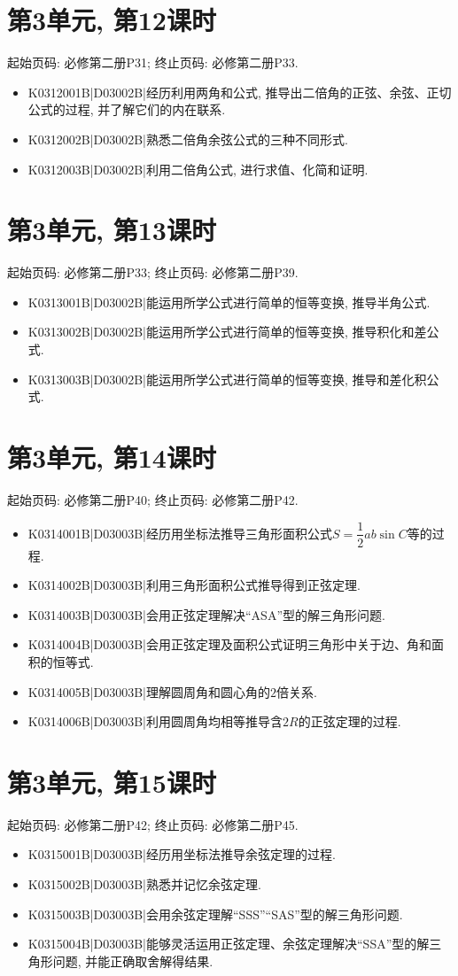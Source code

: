 \section*{第3单元, 第12课时}
起始页码: 必修第二册P31; 终止页码: 必修第二册P33.
\begin{itemize}
\item K0312001B|D03002B|经历利用两角和公式, 推导出二倍角的正弦、余弦、正切公式的过程, 并了解它们的内在联系.
\item K0312002B|D03002B|熟悉二倍角余弦公式的三种不同形式.
\item K0312003B|D03002B|利用二倍角公式, 进行求值、化简和证明.
\end{itemize}

\section*{第3单元, 第13课时}
起始页码: 必修第二册P33; 终止页码: 必修第二册P39.
\begin{itemize}
\item K0313001B|D03002B|能运用所学公式进行简单的恒等变换, 推导半角公式.
\item K0313002B|D03002B|能运用所学公式进行简单的恒等变换, 推导积化和差公式.
\item K0313003B|D03002B|能运用所学公式进行简单的恒等变换, 推导和差化积公式.
\end{itemize}

\section*{第3单元, 第14课时}
起始页码: 必修第二册P40; 终止页码: 必修第二册P42.
\begin{itemize}
\item K0314001B|D03003B|经历用坐标法推导三角形面积公式$S=\dfrac{1}{2}ab\sin C$等的过程.
\item K0314002B|D03003B|利用三角形面积公式推导得到正弦定理.
\item K0314003B|D03003B|会用正弦定理解决``ASA''型的解三角形问题.
\item K0314004B|D03003B|会用正弦定理及面积公式证明三角形中关于边、角和面积的恒等式.
\item K0314005B|D03003B|理解圆周角和圆心角的$2$倍关系.
\item K0314006B|D03003B|利用圆周角均相等推导含$2R$的正弦定理的过程.
\end{itemize}

\section*{第3单元, 第15课时}
起始页码: 必修第二册P42; 终止页码: 必修第二册P45.
\begin{itemize}
\item K0315001B|D03003B|经历用坐标法推导余弦定理的过程.
\item K0315002B|D03003B|熟悉并记忆余弦定理.
\item K0315003B|D03003B|会用余弦定理解``SSS''``SAS''型的解三角形问题.
\item K0315004B|D03003B|能够灵活运用正弦定理、余弦定理解决``SSA''型的解三角形问题, 并能正确取舍解得结果.
\end{itemize}

